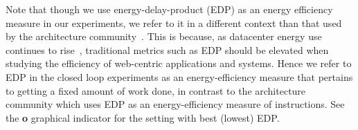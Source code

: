 Note that though we use energy-delay-product (EDP) as an energy efficiency measure in our experiments, we refer to it in a different context than that used by the architecture community~\cite{573184,10.1109/40.888701}.
This is because, as datacenter energy use continues to rise~\cite{gupta2020chasing, NLP-energy,warehouse-power,nature1}, traditional metrics such as EDP should be elevated when studying the efficiency of web-centric applications and systems.
Hence we refer to EDP in the closed loop experiments as an energy-efficiency measure that pertains to getting a fixed amount of work done, in contrast to the architecture community which uses EDP as an energy-efficiency measure of instructions.
See the {\larger[4]\textbf{o}} graphical indicator for the setting with best (lowest) EDP.









